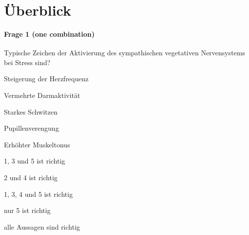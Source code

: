 \section*{Überblick}

\paragraph{Frage 1 (one combination)}

Typische Zeichen der Aktivierung des sympathischen vegetativen Nervensystems bei Stress sind?

\begin{minipage}{.5\linewidth}
  \begin{benumerate}
    \item Steigerung der Herzfrequenz
    \item Vermehrte Darmaktivität
    \item Starkes Schwitzen
    \item Pupillenverengung
    \item Erhöhter Muskeltonus
  \end{benumerate}
\end{minipage}
\hfill
\begin{minipage}{.5\linewidth}
  \begin{checklist}
    \item[\checkedbox] 1, 3 und 5 ist richtig
    \item 2 und 4 ist richtig
    \item 1, 3, 4 und 5 ist richtig
    \item nur 5 ist richtig
    \item alle Aussagen sind richtig
  \end{checklist}
\end{minipage}